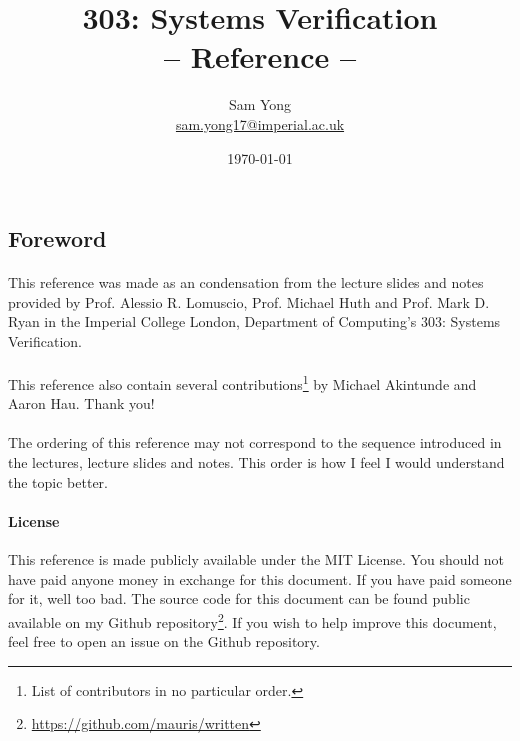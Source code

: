 \documentclass{article}
\title{
	 \huge 303: Systems Verification\\
	 \huge -- Reference --
}
\date{\today}
\author{
	Sam Yong \\
	\small \href{mailto:sam.yong17@imperial.ac.uk}{sam.yong17@imperial.ac.uk}
}
\theoremstyle{plain}
\theoremstyle{definition}
\begin{document}
\maketitle

\begin{multicols}{2}

\section*{Foreword}  

\paragraph{} This reference was made as an condensation from the lecture slides and notes provided by Prof. Alessio R. Lomuscio, Prof. Michael Huth and Prof. Mark D. Ryan in the Imperial College London, Department of Computing's 303: Systems Verification.

\paragraph{} This reference also contain several contributions\footnote{List of contributors in no particular order.} by Michael Akintunde and Aaron Hau. Thank you!

\paragraph{} The ordering of this reference may not correspond to the sequence introduced in the lectures, lecture slides and notes. This order is how I feel I would understand the topic better.

\begin{footnotesize}
\paragraph{License} This reference is made publicly available under the MIT License. You should not have paid anyone money in exchange for this document. If you have paid someone for it, well too bad. The source code for this document can be found public available on my Github repository\footnote{\href{https://github.com/mauris/written}{https://github.com/mauris/written}}. If you wish to help improve this document, feel free to open an issue on the Github repository.
\end{footnotesize}
\newpage

\tableofcontents
\newpage


\end{multicols}
\end{document}

